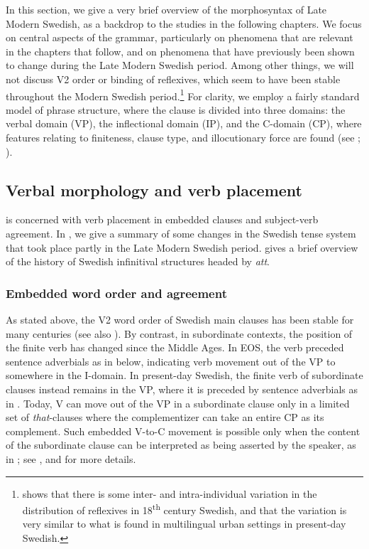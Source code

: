 \documentclass[output=paper]{langscibook}
\begin{document}
In this section, we give a very brief overview of the morphosyntax of Late Modern Swedish, as a backdrop to the studies in the following chapters. We focus on central aspects of the grammar, particularly on phenomena that are relevant in the chapters that follow, and on phenomena that have previously been shown to change during the Late Modern Swedish period. Among other things, we will not discuss V2 order or binding of reflexives, which seem to have been stable throughout the Modern Swedish period.\footnote{\citet{Tingsell2010} shows that there is some inter- and intra-individual variation in the distribution of reflexives in 18\textsuperscript{th} century Swedish, and that the variation is very similar to what is found in multilingual urban settings in present-day Swedish.}  For clarity, we employ a fairly standard model of phrase structure, where the clause is divided into three domains: the verbal domain (VP), the inflectional domain (IP), and the C-domain (CP), where features relating to finiteness, clause type, and illocutionary force are found (see \citealt{Platzack2010}; \citealt{Faarlund2019}). 


\subsection{Verbal morphology and verb placement}\label{sec:intro:3.1}


 is concerned with verb placement in embedded clauses and subject-verb agreement. In , we give a summary of some changes in the Swedish tense system that took place partly in the Late Modern Swedish period.  gives a brief overview of the history of Swedish infinitival structures headed by \textit{att}.


\subsubsection{Embedded word order and agreement}\label{sec:intro:3.1.1}


As stated above, the V2 word order of Swedish main clauses has been stable for many centuries (see also \citealt{Alving1916}). By contrast, in subordinate contexts, the position of the finite verb has changed since the Middle Ages. In EOS, the verb preceded sentence adverbials as in  below, indicating verb movement out of the VP to somewhere in the I-domain. In present-day Swedish, the finite verb of subordinate clauses instead remains in the VP, where it is preceded by sentence adverbials as in . Today, V can move out of the VP in a subordinate clause only in a limited set of \textit{that}{}-clauses where the complementizer can take an entire CP as its complement. Such embedded V-to-C movement is possible only when the content of the subordinate clause can be interpreted as being asserted by the speaker, as in ; see \citet{Julien2015},  and  for more details.
\end{document}
